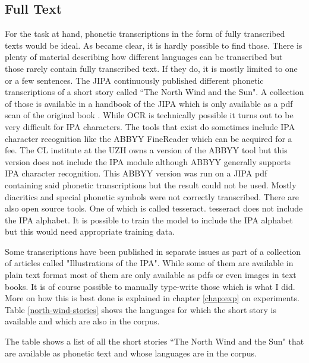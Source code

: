 \subsection{Full Text}
For the task at hand, phonetic transcriptions in the form of fully transcribed texts would be ideal. As became clear, it is hardly possible to find those. There is plenty of material describing how different languages can be transcribed but those rarely contain fully transcribed text. If they do, it is mostly limited to one or a few sentences. The JIPA continuously published different phonetic transcriptions of a short story called ``The North Wind and the Sun". A collection of those is available in a handbook of the JIPA which is only available as a pdf scan of the original book \citep{JIPA2010}. While OCR is technically possible it turns out to be very difficult for IPA characters. The tools that exist do sometimes include IPA character recognition like the ABBYY FineReader which can be acquired for a fee. The CL institute at the UZH owns a version of the ABBYY tool but this version does not include the IPA module although ABBYY generally supports IPA character recognition. This ABBYY version was run on a JIPA pdf containing said phonetic transcriptions but the result could not be used. Mostly diacritics and special phonetic symbols were not correctly transcribed. There are also open source tools. One of which is called tesseract. tesseract does not include the IPA alphabet. It is possible to train the model to include the IPA alphabet but this would need appropriate training data. 

Some transcriptions have been published in separate issues as part of a collection of articles called "Illustrations of the IPA". While some of them are available in plain text format most of them are only available as pdfs or even images in text books. It is of course possible to manually type-write those which is what I did. More on how this is best done is explained in chapter \ref{chap:exp} on experiments. Table \ref{north-wind-stories} shows the languages for which the short story is available and which are also in the corpus.

\begin{table}[h!]
\begin{center}
\caption[The North Wind and the Sun]{The table shows a list of all the short stories ``The North Wind and the Sun" that are available as phonetic text and whose languages are in the corpus.}
\label{north-wind-stories}
\end{center}
\end{table}



